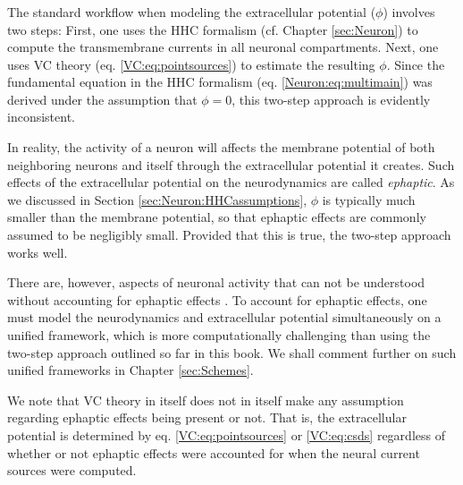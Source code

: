 \subsubsection{ }
\label{sec:VC:ephaptic}
The standard workflow when modeling the extracellular potential ($\phi$) involves two steps: First, one uses the HHC formalism (cf. Chapter \ref{sec:Neuron}) to compute the transmembrane currents in all neuronal compartments. Next, one uses VC theory (eq. \ref{VC:eq:pointsources}) to estimate the resulting $\phi$. Since the fundamental equation in the HHC formalism (eq. \ref{Neuron:eq:multimain}) was derived under the assumption that $\phi=0$, this two-step approach is evidently inconsistent. 

In reality, the activity of a neuron will affects the membrane potential of both neighboring neurons and itself through the extracellular potential it creates. Such effects of the extracellular potential on the neurodynamics are called \textit{ephaptic}. As we discussed in Section \ref{sec:Neuron:HHCassumptions}, $\phi$ is typically much smaller than the membrane potential, so that ephaptic effects are commonly assumed to be negligibly small. Provided that this is true, the two-step approach works well. 

There are, however, aspects of neuronal activity that can not be understood without accounting for ephaptic effects \citep{Holt1999, anastassiou2015, Goldwyn2016}. To account for ephaptic effects, one must model the neurodynamics and extracellular potential simultaneously on a unified framework, which is more computationally challenging than using the two-step approach outlined so far in this book. We shall comment further on such unified frameworks in Chapter \ref{sec:Schemes}.

We note that VC theory in itself does not in itself make any assumption regarding ephaptic effects being present or not. That is, the extracellular potential is determined by eq. \ref{VC:eq:pointsources} or \ref{VC:eq:csds} regardless of whether or not ephaptic effects were accounted for when the neural current sources were computed. 




